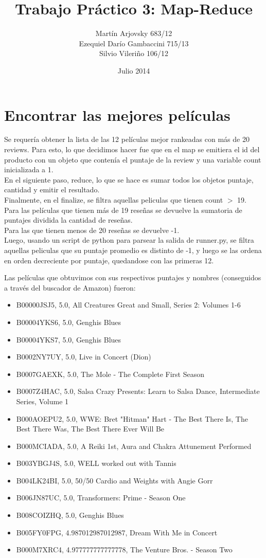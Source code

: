 \documentclass{article}
\title{Trabajo Pr\'actico 3: Map-Reduce}
\author{Mart\'{i}n Arjovsky 683/12 \\ Ezequiel Dar\'io Gambaccini 715/13 \\ Silvio Vileri\~no 106/12}
\date{Julio 2014}
\begin{document}
\maketitle

\section{Encontrar las mejores pel\'iculas}

 Se requer\'ia obtener la lista de las 12 pel\'iculas mejor rankeadas con m\'as de 20 reviews. Para esto, lo que decidimos hacer fue que en el map se emitiera el id del producto con un objeto que conten\'ia el puntaje de la review y una variable count inicializada a 1.
\\ En el siguiente paso, reduce, lo que se hace es sumar todos los objetos {puntaje, cantidad} y emitir el resultado.
\\ Finalmente, en el finalize, se filtra aquellas peliculas que tienen count $>$ 19. Para las pel\'iculas que tienen m\'as de 19 rese\~nas se devuelve la sumatoria de puntajes dividida la cantidad de rese\~nas.
\\ Para las que tienen menos de 20 rese\~nas se devuelve -1.
\\ Luego, usando un script de python para parsear la salida de runner.py, se filtra aquellas peliculas que su puntaje promedio es distinto de -1, y luego se las ordena en orden decreciente por puntaje, quedandose con las primeras 12.

Las pel\'iculas que obtuvimos con sus respectivos puntajes y nombres (conseguidos a trav\'es del buscador de Amazon) fueron:

\begin{itemize}
\item B00000JSJ5, 5.0, All Creatures Great and Small, Series 2: Volumes 1-6
\item B00004YKS6, 5.0, Genghis Blues
\item B00004YKS7, 5.0, Genghis Blues
\item B0002NY7UY, 5.0, Live in Concert (Dion)
\item B0007GAEXK, 5.0, The Mole - The Complete First Season
\item B0007Z4HAC, 5.0, Salsa Crazy Presents: Learn to Salsa Dance, Intermediate Series, Volume 1
\item B000AOEPU2, 5.0, WWE: Bret "Hitman" Hart - The Best There Is, The Best There Was, The Best There Ever Will Be
\item B000MCIADA, 5.0, A Reiki 1st, Aura and Chakra Attunement Performed
\item B003YBGJ4S, 5.0, WELL worked out with Tannis
\item B004LK24BI, 5.0, 50/50 Cardio and Weights with Angie Gorr
\item B006JN87UC, 5.0, Transformers: Prime - Season One
\item B008COIZHQ, 5.0, Genghis Blues
\item B005FY0FPG, 4.987012987012987, Dream With Me in Concert
\item B000M7XRC4, 4.977777777777778, The Venture Bros. - Season Two
\end{itemize}
\end{document}
